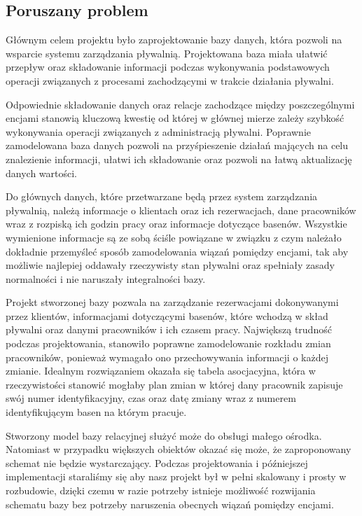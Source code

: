 \documentclass[a4paper]{article}
\begin{document}
\subsection{Poruszany problem}

Głównym celem projektu było zaprojektowanie bazy danych, która pozwoli na wsparcie systemu zarządzania pływalnią. Projektowana baza miała ułatwić przepływ oraz składowanie informacji podczas wykonywania podstawowych operacji związanych z procesami zachodzącymi w trakcie działania pływalni.

Odpowiednie składowanie danych oraz relacje zachodzące między poszczególnymi encjami stanowią kluczową kwestię od której w głównej mierze zależy szybkość wykonywania operacji związanych z administracją pływalni. Poprawnie zamodelowana baza danych pozwoli na przyśpieszenie działań mających na celu znalezienie informacji, ułatwi ich składowanie oraz pozwoli na łatwą aktualizację danych wartości.

Do głównych danych, które przetwarzane będą przez system zarządzania pływalnią, należą informacje o klientach oraz ich rezerwacjach, dane pracowników wraz z rozpiską ich godzin pracy oraz informacje dotyczące basenów. Wszystkie wymienione informacje są ze sobą ściśle powiązane w związku z czym należało dokładnie przemyśleć sposób zamodelowania wiązań pomiędzy encjami, tak aby możliwie najlepiej oddawały rzeczywisty stan pływalni oraz spełniały zasady normalności i nie naruszały integralności bazy.

Projekt stworzonej bazy pozwala na zarządzanie rezerwacjami dokonywanymi przez klientów, informacjami dotyczącymi basenów, które wchodzą w skład pływalni oraz danymi pracowników i ich czasem pracy. Największą trudność podczas projektowania, stanowiło poprawne zamodelowanie rozkładu zmian pracowników, ponieważ wymagało ono przechowywania informacji o każdej zmianie. Idealnym rozwiązaniem okazała się tabela asocjacyjna, która w rzeczywistości stanowić mogłaby plan zmian w której dany pracownik zapisuje swój numer identyfikacyjny, czas oraz datę zmiany wraz z numerem identyfikującym basen na którym pracuje.

Stworzony model bazy relacyjnej służyć może do obsługi małego ośrodka. Natomiast w przypadku większych obiektów okazać się może, że zaproponowany schemat nie będzie wystarczający. Podczas projektowania i późniejszej implementacji staraliśmy się aby nasz projekt był w pełni skalowany i prosty w rozbudowie, dzięki czemu w razie potrzeby istnieje możliwość rozwijania schematu bazy bez potrzeby naruszenia obecnych wiązań pomiędzy encjami.
\end{document}
